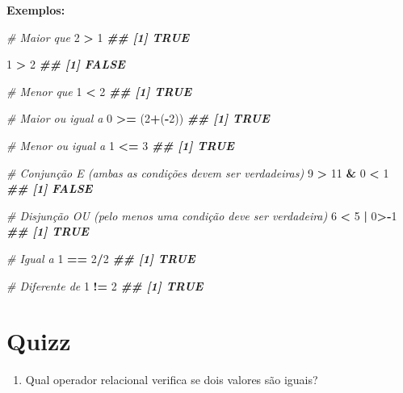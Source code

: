 \documentclass[
]{book}
\newenvironment{Shaded}{\begin{snugshade}}{\end{snugshade}}
\newcommand{\CommentTok}[1]{\textcolor[rgb]{0.56,0.35,0.01}{\textit{#1}}}
\newcommand{\DecValTok}[1]{\textcolor[rgb]{0.00,0.00,0.81}{#1}}
\newcommand{\DocumentationTok}[1]{\textcolor[rgb]{0.56,0.35,0.01}{\textbf{\textit{#1}}}}
\newcommand{\NormalTok}[1]{#1}
\newcommand{\SpecialCharTok}[1]{\textcolor[rgb]{0.81,0.36,0.00}{\textbf{#1}}}
\providecommand{\tightlist}{%
  \setlength{\itemsep}{0pt}\setlength{\parskip}{0pt}}
\begin{document}
\textbf{Exemplos:}

\begin{Shaded}
\begin{Highlighting}[]
\CommentTok{\# Maior que }
\DecValTok{2} \SpecialCharTok{\textgreater{}} \DecValTok{1}
\DocumentationTok{\#\# [1] TRUE}

\DecValTok{1} \SpecialCharTok{\textgreater{}} \DecValTok{2}
\DocumentationTok{\#\# [1] FALSE}

\CommentTok{\# Menor que}
\DecValTok{1} \SpecialCharTok{\textless{}} \DecValTok{2}
\DocumentationTok{\#\# [1] TRUE}

\CommentTok{\# Maior ou igual a}
\DecValTok{0} \SpecialCharTok{\textgreater{}=}\NormalTok{ (}\DecValTok{2}\SpecialCharTok{+}\NormalTok{(}\SpecialCharTok{{-}}\DecValTok{2}\NormalTok{))}
\DocumentationTok{\#\# [1] TRUE}

\CommentTok{\# Menor ou igual a }
\DecValTok{1} \SpecialCharTok{\textless{}=} \DecValTok{3}
\DocumentationTok{\#\# [1] TRUE}

\CommentTok{\# Conjunção E (ambas as condições devem ser verdadeiras)}
\DecValTok{9} \SpecialCharTok{\textgreater{}} \DecValTok{11} \SpecialCharTok{\&} \DecValTok{0} \SpecialCharTok{\textless{}} \DecValTok{1}
\DocumentationTok{\#\# [1] FALSE}

\CommentTok{\# Disjunção OU (pelo menos uma condição deve ser verdadeira)}
\DecValTok{6} \SpecialCharTok{\textless{}} \DecValTok{5} \SpecialCharTok{|} \DecValTok{0}\SpecialCharTok{\textgreater{}{-}}\DecValTok{1}
\DocumentationTok{\#\# [1] TRUE}

\CommentTok{\# Igual a}
\DecValTok{1} \SpecialCharTok{==} \DecValTok{2}\SpecialCharTok{/}\DecValTok{2}
\DocumentationTok{\#\# [1] TRUE}

\CommentTok{\# Diferente de}
\DecValTok{1} \SpecialCharTok{!=} \DecValTok{2}
\DocumentationTok{\#\# [1] TRUE}
\end{Highlighting}
\end{Shaded}

\section{Quizz}\label{quizz-1}

\begin{enumerate}
\def\labelenumi{\arabic{enumi}.}
\tightlist
\item
  Qual operador relacional verifica se dois valores são iguais?
\end{enumerate}
\end{document}
